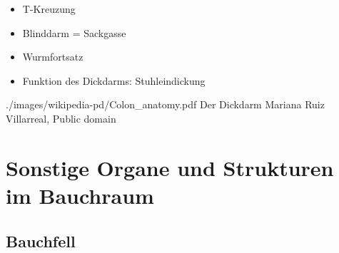 {
\begin{itemize}
  \item T-Kreuzung
  \item Blinddarm = Sackgasse
  \item Wurmfortsatz
  \item Funktion des Dickdarms: Stuhleindickung
\end{itemize}
}
{./images/wikipedia-pd/Colon_anatomy.pdf}
{Der Dickdarm}
{Mariana Ruiz Villarreal,
    Public domain}


\section[Sonstige Strukturen im Bauchraum]{Sonstige Organe und Strukturen im Bauchraum}
\label{topic:sonstige-strukturen}
\label{topic:sonstige-bauchorgane}

\subsection{Bauchfell}



